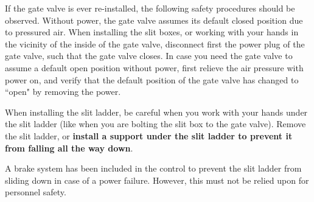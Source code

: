 If the gate valve is ever re-installed, the following safety
procedures should be observed.  Without power, the gate valve assumes its default closed position due to
pressured air. When installing the slit boxes, or working with your hands
in the vicinity of the inside of the gate valve, disconnect first the power
plug of the gate valve, such that the gate valve closes.
In case you need the gate valve to assume a default open position without
power, first relieve the air pressure
with power on, and verify that the default position of the gate valve has
changed to ``open" by removing the power.

When installing the slit ladder, be careful when you work with your hands
under the slit ladder (like when you are bolting the slit box to the
gate valve). Remove the slit ladder, or {\bf install a support under the slit
ladder to prevent it from falling all the way down}.

A brake system has been included in the control to prevent the slit ladder
from sliding down in case of a power failure.  However, this must not
be relied upon for personnel safety.

